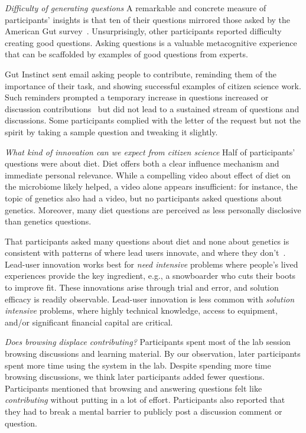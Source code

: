 \textit{Difficulty of generating questions}
A remarkable and concrete measure of participants’ insights is that ten of their questions mirrored those asked by the American Gut survey~\cite{KnightLab2016}. Unsurprisingly, other participants reported difficulty creating good questions. Asking questions is a valuable metacognitive experience that can be scaffolded by examples of good questions from experts. 

Gut Instinct sent email asking people to contribute, reminding them of the importance of their task, and showing successful examples of citizen science work. Such reminders 
prompted a temporary increase in questions increased or discussion contributions~\cite{Kotturi2015} but did not lead to a sustained stream of questions and discussions. Some participants complied with the letter of the request but not the spirit by taking a sample question and tweaking it slightly.

\textit{What kind of innovation can we expect from citizen science}
Half of participants’ questions were about diet. Diet offers both a clear influence mechanism and immediate personal relevance. While a compelling video about effect of diet on the microbiome likely helped, a video alone appears insufficient: for instance, the topic of genetics also had a video, but no participants asked questions about genetics. Moreover, many diet questions are perceived as less personally disclosive than genetics questions.
 
That participants asked many questions about diet and none about genetics is consistent with patterns of where lead users innovate, and where they don’t~\cite{VonHippel2005a}. Lead-user innovation works best for \textit{need intensive} problems where people’s lived experiences provide the key ingredient, e.g., a snowboarder who cuts their boots to improve fit. These innovations arise through trial and error, and solution efficacy is readily observable. Lead-user innovation is less common with \textit{solution intensive} problems, where highly technical knowledge, access to equipment, and/or significant financial capital are critical. 
 
\textit{Does browsing displace contributing?}
Participants spent most of the lab session browsing discussions and learning material. By our observation, later participants spent more time using the system in the lab. Despite spending more time browsing discussions, we think later participants added fewer questions. Participants mentioned that browsing and answering questions felt like \textit{contributing} without putting in a lot of effort. Participants also reported that they had to break a mental barrier to publicly post a discussion comment or question. 

